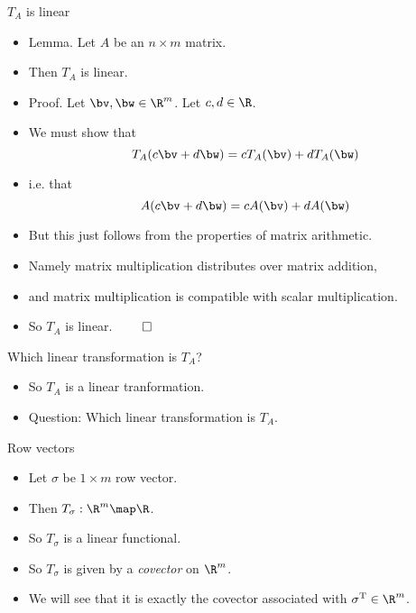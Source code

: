 \documentclass{beamer}
\begin{document}
\begin{frame}{$T_A$ is linear}

\begin{itemize}
\item Lemma. Let $A$ be an $n\times m$ matrix.
\item Then $T_A$ is linear.
\item Proof. Let $\bv,\bw\in\R^m$. Let $c,d\in\R$.
\item We must show that
$$T_A(c\bv + d\bw) = c T_A(\bv) + d T_A(\bw)$$
\item i.e. that
$$A(c\bv + d\bw) = c A(\bv) + d A(\bw)$$
\item But this just follows from the properties of matrix arithmetic.
\item Namely matrix multiplication distributes over matrix addition,
\item and matrix multiplication is compatible with scalar multiplication.
\item So $T_A$ is linear. $\qed$
\end{itemize}
\end{frame}

\begin{frame}{Which linear transformation is $T_A$?}

\begin{itemize}
\item So $T_A$ is a linear tranformation.
\item Question: Which linear transformation is $T_A$.
\end{itemize}
\end{frame}

\begin{frame}{Row vectors}

\begin{itemize}
\item Let $\sigma$ be $1\times m$ row vector.
\item Then $T_{\sigma}:\R^m \map \R$.
\item So $T_{\sigma}$ is a linear functional.
\item So $T_{\sigma}$ is given by a \emph{covector} on $\R^m$.
\item We will see that it is exactly the covector associated with $\sigma^{\text{T}}\in\R^m$.
\end{itemize}
\end{frame}
\end{document}
